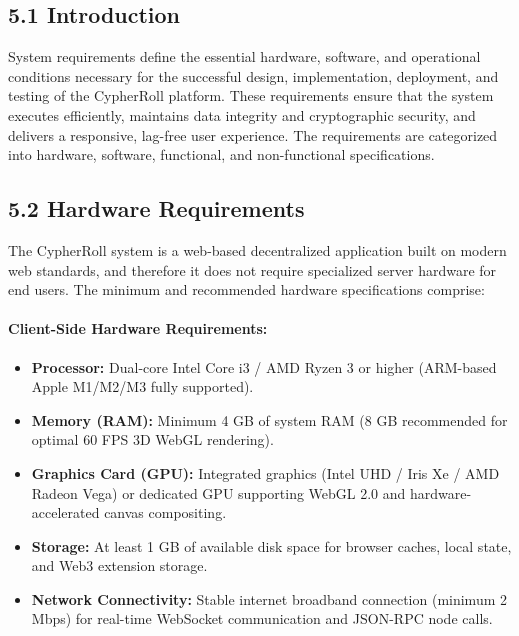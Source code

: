 \vspace{1.0cm}
\par
\label{chap:requirements}
\vspace{0.15cm}
\par
\vspace{0.3cm}

\subsection*{5.1 Introduction}
System requirements define the essential hardware, software, and operational conditions necessary for the successful design, implementation, deployment, and testing of the CypherRoll platform. These requirements ensure that the system executes efficiently, maintains data integrity and cryptographic security, and delivers a responsive, lag-free user experience. The requirements are categorized into hardware, software, functional, and non-functional specifications.

\subsection*{5.2 Hardware Requirements}
The CypherRoll system is a web-based decentralized application built on modern web standards, and therefore it does not require specialized server hardware for end users. The minimum and recommended hardware specifications comprise:

\paragraph{Client-Side Hardware Requirements:}
\begin{itemize}[leftmargin=1.5em]
    \item \textbf{Processor:} Dual-core Intel Core i3 / AMD Ryzen 3 or higher (ARM-based Apple M1/M2/M3 fully supported).
    \item \textbf{Memory (RAM):} Minimum 4 GB of system RAM (8 GB recommended for optimal 60 FPS 3D WebGL rendering).
    \item \textbf{Graphics Card (GPU):} Integrated graphics (Intel UHD / Iris Xe / AMD Radeon Vega) or dedicated GPU supporting WebGL 2.0 and hardware-accelerated canvas compositing.
    \item \textbf{Storage:} At least 1 GB of available disk space for browser caches, local state, and Web3 extension storage.
    \item \textbf{Network Connectivity:} Stable internet broadband connection (minimum 2 Mbps) for real-time WebSocket communication and JSON-RPC node calls.
\end{itemize}

